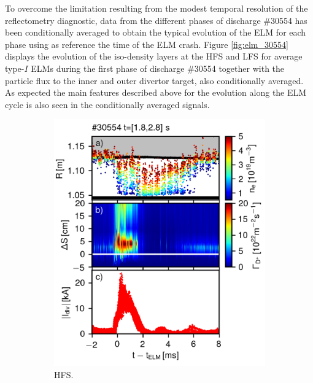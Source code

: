 \documentclass[12pt]{iopart}
\begin{document}
To overcome the limitation resulting from the modest temporal resolution of the reflectometry diagnostic, data from the different phases of discharge \#30554 has been conditionally averaged to obtain the typical evolution of the ELM for each phase using as reference the time of the ELM crash. Figure \ref{fig:elm_30554} displays the evolution of the iso-density layers at the HFS and LFS for average type-$I$ ELMs during the first phase of discharge \#30554 together with the particle flux to the inner and outer divertor target, also conditionally averaged. As expected the main features described above for the evolution along the ELM cycle is also seen in the conditionally averaged signals.

\begin{figure}[!hbt]
\centering
	\begin{subfigure}{3in}
    \includegraphics{ssidiv_30554_1_8_2_8_inin.png}
	\caption{HFS.}
	\end{subfigure}
	~
	\begin{subfigure}{3in}

\end{subfigure}
\end{figure}
\end{document}
